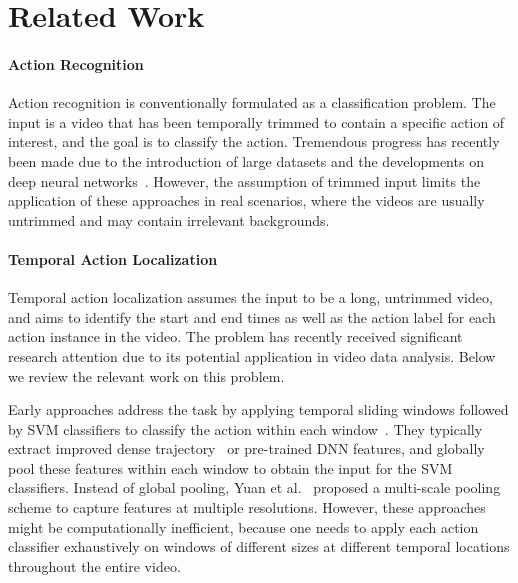 \documentclass[10pt,twocolumn,letterpaper]{article}
\begin{document}
\section{Related Work}

\paragraph{Action Recognition} Action recognition is conventionally formulated
as a classification problem. The input is a video that has been temporally
trimmed to contain a specific action of interest, and the goal is to classify
the action. Tremendous progress has recently been made due to the introduction
of large datasets and the developments on deep neural
networks~\cite{simonyan:nips2014,ng:cvpr2015,tran:iccv2015,wang:eccv2016,carreira:cvpr2017,feichtenhofer:cvpr2017}.
However, the assumption of trimmed input limits the application of these
approaches in real scenarios, where the videos are usually untrimmed and may
contain irrelevant backgrounds.

\vspace{-3mm}

\paragraph{Temporal Action Localization} Temporal action localization assumes
the input to be a long, untrimmed video, and aims to identify the start and end
times as well as the action label for each action instance in the video. The
problem has recently received significant research attention due to its
potential application in video data analysis. Below we review the relevant work
on this problem.

Early approaches address the task by applying temporal sliding windows followed
by SVM classifiers to classify the action within each
window~\cite{karaman:2014,oneata:2014,wang:2014,ni:cvpr2016,yuan:cvpr2016}.
They typically extract improved dense trajectory~\cite{wang:iccv2013} or
pre-trained DNN features, and globally pool these features within each window
to obtain the input for the SVM classifiers. Instead of global pooling, Yuan et
al.~\cite{yuan:cvpr2016} proposed a multi-scale pooling scheme to capture
features at multiple resolutions. However, these approaches might be
computationally inefficient, because one needs to apply each action classifier
exhaustively on windows of different sizes at different temporal locations
throughout the entire video.
\end{document}
